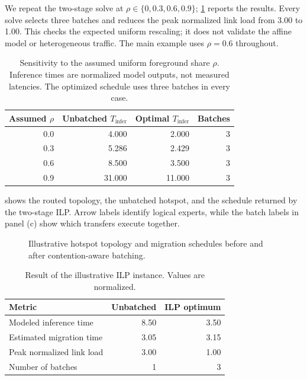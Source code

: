 We repeat the two-stage solve at $\rho\in\{0,0.3,0.6,0.9\}$;
\cref{tab:rho-sensitivity} reports the results. Every solve selects three
batches and reduces the peak normalized link load from 3.00 to 1.00. This
checks the expected uniform rescaling; it does not validate the affine model
or heterogeneous traffic. The main example uses $\rho=0.6$ throughout.

\begin{table}[t]
  \centering
  \caption{Sensitivity to the assumed uniform foreground share $\rho$.
  Inference times are normalized model outputs, not measured latencies.
  The optimized schedule uses three batches in every case.}
  \label{tab:rho-sensitivity}
  \begin{tabular}{rrrr}
    \toprule
    Assumed $\rho$ & Unbatched $T_{\mathrm{infer}}$ & Optimal $T_{\mathrm{infer}}$ & Batches \\
    \midrule
    0.0 & 4.000 & 2.000 & 3 \\
    0.3 & 5.286 & 2.429 & 3 \\
    0.6 & 8.500 & 3.500 & 3 \\
    0.9 & 31.000 & 11.000 & 3 \\
    \bottomrule
  \end{tabular}
\end{table}

 shows the routed topology, the unbatched hotspot,
and the schedule returned by the two-stage ILP. Arrow labels identify logical
experts, while the batch labels in panel (c) show which transfers
execute together.

\begin{figure}[p]
  \centering
  
  \caption{Illustrative hotspot topology and migration schedules before and
  after contention-aware batching.}
  \label{fig:ilp-before-after}
\end{figure}

\begin{table}[t]
  \centering
  \caption{Result of the illustrative ILP instance. Values are normalized.}
  \label{tab:ilp-result}
  \begin{tabular}{lrr}
    \toprule
    Metric & Unbatched & ILP optimum \\
    \midrule
    Modeled inference time & 8.50 & 3.50 \\
    Estimated migration time & 3.05 & 3.15 \\
    Peak normalized link load & 3.00 & 1.00 \\
    Number of batches & 1 & 3 \\
    \bottomrule
  \end{tabular}
\end{table}


